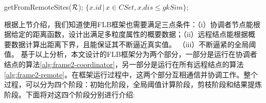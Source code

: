 \begin{algorithm}[!t]
\begin{algorithmic}[1]
		\RETURN  \textsf{getFromRemoteSites}(${\cal R}$); \label{a3:EPruneRemote}
		\ENDIF
		\ELSE
		 
		\RETURN  $\{x.id \,| \, x \in CSet, x.dis \le gkSim  \} $; \label{a3:return}
		\ENDIF
		\ENDWHILE
	\end{algorithmic}
\end{algorithm}

根据上节介绍，我们知道使用FLB框架也需要满足三点条件：（i）协调者节点能根据给定的距离函数，设计出满足多粒度属性的概要数据；（ii）远程结点能根据概要数据计算出距离下界，且能保证其不断逼近真实值。
（iii）不断逼紧的全局阈值。
基于以上分析，本文设计的FLB框架分为两个部分，一部分是运行在协调者结点的算法\ref{alg:frame2-coordinator}，另一部分是运行在所有远程结点的算法\ref{alg:frame2-remote}。在框架运行过程中，这两个部分互相通信并协调工作。整个过程，可以分为四个阶段：初始化阶段，全局阈值计算阶段，剪枝阶段和结果提炼阶段。下面将对这四个阶段分别进行介绍:

